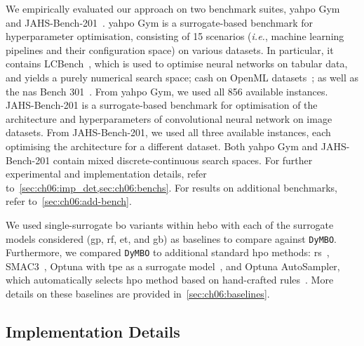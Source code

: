 We empirically evaluated our approach on two benchmark suites, \gls{yahpo} Gym~\citep{PfiEtAl22} and JAHS-Bench-201~\citep{BanEtAl22}.
\gls{yahpo} Gym is a surrogate-based benchmark for hyperparameter optimisation, consisting of 15 scenarios (\emph{i.e.}, machine learning pipelines and their configuration space) on various datasets.
In particular, it contains LCBench~\citep{ZimEtAl21b}, which is used to optimise neural networks on tabular data, and yields a purely numerical search space; \gls{cash} on OpenML datasets~\citep{BinEtAl20,FalEtAl18}; as well as the \gls{nas} Bench 301~\citep{ZelEtAl22}.
From \gls{yahpo} Gym, we used all 856 available instances.
JAHS-Bench-201 is a surrogate-based benchmark for optimisation of the architecture and hyperparameters of convolutional neural network on image datasets.
From JAHS-Bench-201, we used all three available instances, each optimising the architecture for a different dataset.
Both \gls{yahpo} Gym and JAHS-Bench-201 contain mixed discrete-continuous search spaces.
For further experimental and implementation details, refer to~\cref{sec:ch06:imp_det,sec:ch06:benchs}.
For results on additional benchmarks, refer to~\cref{sec:ch06:add-bench}.

We used single-surrogate \gls{bo} variants within \gls{hebo} with each of the surrogate models considered (\gls{gp}, \gls{rf}, \gls{et}, and \gls{gb}) as baselines to compare against \texttt{DyMBO}.
Furthermore, we compared \texttt{DyMBO} to additional standard \gls{hpo} methods: \gls{rs}~\citep{BerEtAl11}, SMAC3~\citep{LinEtAl22b, HutEtAl11}, Optuna with \gls{tpe} as a surrogate model~\citep{BerEtAl11,AkiEtAl19}, and Optuna AutoSampler, which automatically selects \gls{hpo} method based on hand-crafted rules~\citep{Ozaki24}.
More details on these baselines are provided in~\cref{sec:ch06:baselines}.

\subsection{Implementation Details}
\label{sec:ch06:imp_det}

